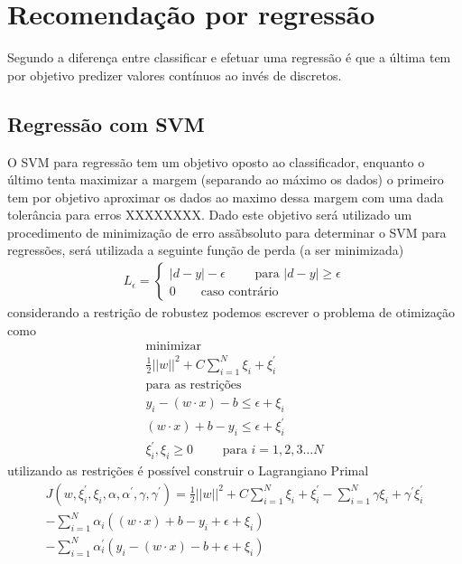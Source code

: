 \section{Recomendação por regressão}\label{SEC_RECOMENDACAO_REGRESSAO}
Segundo  a diferença entre classificar e efetuar uma regressão é que a última tem por objetivo predizer valores contínuos ao invés de discretos.

\subsection{Regressão com SVM}
O SVM para regressão tem um objetivo oposto ao classificador, enquanto o último tenta maximizar a margem (separando ao máximo os dados) o primeiro tem por objetivo aproximar os dados ao maximo dessa margem com uma dada tolerância para erros XXXXXXXX. Dado este objetivo será utilizado um procedimento de minimização de erro assãbsoluto para determinar o SVM para regressões, será utilizada a seguinte função de perda (a ser minimizada)
\begin{align}
L_{\epsilon} = 	\begin{cases}
						|d - y| - \epsilon  \qquad	\textrm{ para } |d - y| \geq \epsilon \\
						0					\qquad	\textrm{caso contrário}
				\end{cases}
\end{align}
considerando a restrição de robustez podemos escrever o problema de otimização como
\begin{align}
\nonumber \textrm{minimizar}\\
\frac{1}{2}||w||^{2} + C \sum\limits_{i=1}^{N} \xi_{i} + \xi_{i}^{'}\\
\nonumber \textrm{para as restrições}\\
y_{i} - (w \cdot x) - b \leq \epsilon + \xi_{i}\\
(w \cdot x) + b - y_{i}  \leq \epsilon + \xi_{i}^{'}\\
\xi_{i}^{'}, \xi_{i} \geq 0 \qquad \textrm{ para } i =1, 2, 3 \ldots N
\end{align}
utilizando as restrições é possível construir o Lagrangiano Primal
\begin{align}
J(w,\xi_{i}^{'}, \xi_{i}, \alpha, \alpha^{'}, \gamma, \gamma^{'}) = \frac{1}{2}||w||^{2} + C \sum\limits_{i=1}^{N} \xi_{i} + \xi_{i}^{'} - \sum\limits_{i=1}^{N} \gamma\xi_{i} + \gamma^{'}\xi_{i}^{'} \\
-\sum\limits_{i=1}^{N}\alpha_{i}((w \cdot x) + b - y_{i}+ \epsilon + \xi_{i}) \\
- \sum\limits_{i=1}^{N}\alpha_{i}^{'}(y_{i} - (w \cdot x) - b +\epsilon + \xi_{i}) \label{EQU_SVM_REGRESSAO_LAGRANGIANO_PRIMAL}
\end{align}
